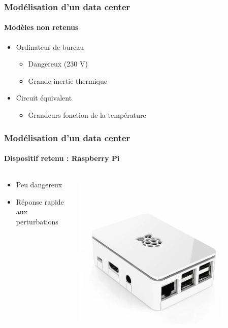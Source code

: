 \documentclass[a4paper,11pt]{beamer}
\begin{document}
\begin{frame}
    \frametitle{Modélisation d'un data center}
    \framesubtitle{Modèles non retenus}

    \begin{itemize}
        \item Ordinateur de bureau
        \begin{itemize}
            \item Dangereux (230 V)
            \item Grande inertie thermique
        \end{itemize}
        \item Circuit équivalent
        \begin{itemize}
            \item Grandeurs fonction de la température
        \end{itemize}
    \end{itemize}
\end{frame} %

\begin{frame}
    \frametitle{Modélisation d'un data center}
    \framesubtitle{Dispositif retenu : Raspberry Pi}

    \begin{columns}
        \begin{column}{0.5\textwidth}
            \begin{itemize}
                \item Peu dangereux
                \item Réponse rapide aux perturbations
            \end{itemize}
        \end{column}
        \begin{column}{0.5\textwidth}
            \includegraphics[width=0.8\textwidth]{raspberry_pi.jpg}
        \end{column}
    \end{columns}
\end{frame}
\end{document}
